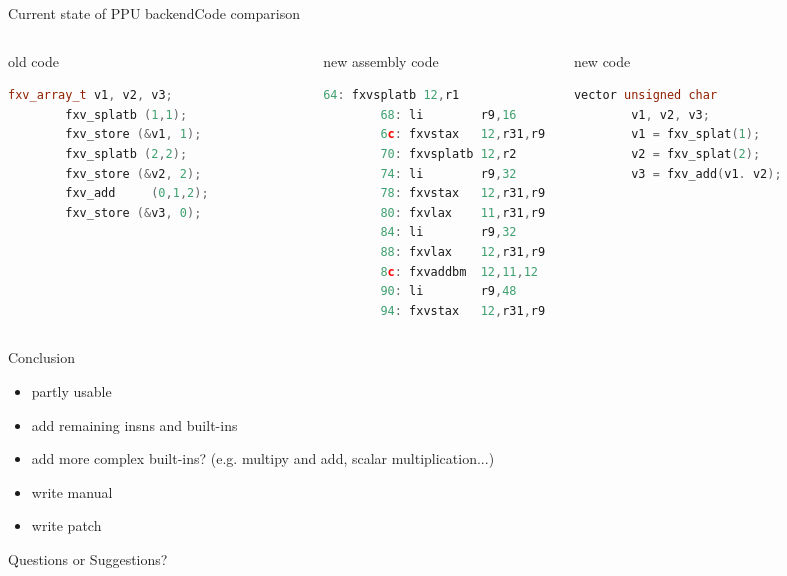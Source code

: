 \documentclass[10pt]{beamer}
\begin{document}
\begin{frame}[fragile]{Current state of PPU backend}{Code comparison}
\begin{columns}[t]
	\begin{column}{0.3\textwidth}
      \begin{block}{old code}
       \begin{lstlisting}[language=C++,basicstyle=\ttfamily\scriptsize,keywordstyle=\color{red}]
		fxv_array_t v1, v2, v3;
		fxv_splatb (1,1);
		fxv_store (&v1, 1);
		fxv_splatb (2,2);
		fxv_store (&v2, 2);
		fxv_add 	(0,1,2);
		fxv_store (&v3, 0);				
	\end{lstlisting}
      \end{block}
    \end{column}    
    \begin{column}{0.3\textwidth}
      \begin{block}{new assembly code}
        \begin{lstlisting}[language=C++,basicstyle=\ttfamily\scriptsize,keywordstyle=\color{red}]
		64: fxvsplatb 12,r1 
		68: li        r9,16
		6c: fxvstax   12,r31,r9
		70: fxvsplatb 12,r2
		74: li        r9,32
		78: fxvstax   12,r31,r9
		80: fxvlax    11,r31,r9
		84: li        r9,32
		88: fxvlax    12,r31,r9
		8c: fxvaddbm  12,11,12
		90: li        r9,48
		94: fxvstax   12,r31,r9
	\end{lstlisting}
      \end{block}
    \end{column}
    \begin{column}{0.3\textwidth}
      \begin{block}{new code}
        \begin{lstlisting}[language=C++,basicstyle=\ttfamily\scriptsize,keywordstyle=\color{red}]
		vector unsigned char
		v1, v2, v3;
		v1 = fxv_splat(1);
		v2 = fxv_splat(2);	
		v3 = fxv_add(v1. v2);			
	\end{lstlisting}
      \end{block}
    \end{column}
\end{columns}
\end{frame}

\begin{frame}{Conclusion}
	\begin{itemize}
		\item partly usable
		\item add remaining insns and built-ins
		\item add more complex built-ins? (e.g. multipy and add, scalar multiplication...)
		\item write manual
		\item write patch
	\end{itemize}
\end{frame}

\begin{frame}[plain,c]
\begin{center}
\Huge Questions or Suggestions?
\end{center}
\end{frame}
\end{document}
